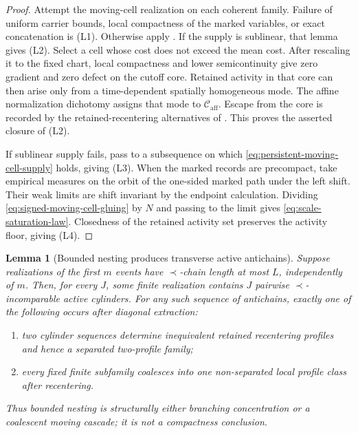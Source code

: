 \documentclass[11pt]{amsart}
\numberwithin{equation}{section}
\theoremstyle{plain}
\newtheorem{lemma}[lemma]{Lemma}
\theoremstyle{definition}
\theoremstyle{remark}
\newcommand{\Caff}{\mathcal C_{\mathrm{aff}}}
\begin{document}
\begin{proof}
Attempt the moving-cell realization on each coherent family.  Failure of
uniform carrier bounds, local compactness of the marked variables, or exact
concatenation is \textup{(L1)}.  Otherwise apply
.  If the supply is sublinear, that lemma
gives \textup{(L2)}.  Select a cell whose cost does not exceed the mean cost.
After rescaling it to the fixed chart, local compactness and lower
semicontinuity give zero gradient and zero defect on the cutoff core.  Retained
activity in that core can then arise only from a time-dependent spatially
homogeneous mode.  The affine normalization dichotomy
 assigns that
mode to \(\Caff\).  Escape from the core is recorded by the retained-recentering alternatives of
.  This proves the asserted
closure of \textup{(L2)}.

If sublinear supply fails, pass to a subsequence on which
\eqref{eq:persistent-moving-cell-supply} holds, giving \textup{(L3)}.  When
the marked records are precompact, take empirical measures on the orbit of the
one-sided marked path under the left shift.  Their weak limits are shift
invariant by the endpoint calculation.
Dividing \eqref{eq:signed-moving-cell-gluing} by \(N\) and passing to the
limit gives \eqref{eq:scale-saturation-law}.  Closedness of the retained
activity set preserves the activity floor, giving \textup{(L4)}.
\end{proof}

\begin{lemma}[Bounded nesting produces transverse active antichains]
\label{lem:bounded-nesting-active-antichains}
Suppose realizations of the first \(m\) events have \(\prec\)-chain length at
most \(L\), independently of \(m\).  Then, for every \(J\), some finite
realization contains \(J\) pairwise \(\prec\)-incomparable active cylinders.
For any such sequence of antichains, exactly one of the following occurs after
diagonal extraction:
\begin{enumerate}[label=\textup{(A\arabic*)}]
 \item two cylinder sequences determine inequivalent retained recentering
 profiles and hence a separated two-profile family;
 \item every fixed finite subfamily coalesces into one non-separated local
 profile class after recentering.
\end{enumerate}
Thus bounded nesting is structurally either branching concentration or a
coalescent moving cascade; it is not a compactness conclusion.
\end{lemma}
\end{document}
